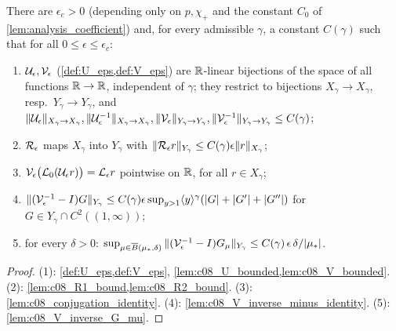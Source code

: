 \begin{lemma}
  \label{lem:linear_conjugation}
  There are $\epsilon_c>0$ (depending only on $p,\chi_+$ and the constant $C_0$ of
  \cref{lem:analysis_coefficient}) and, for every admissible $\gamma$, a constant $C(\gamma)$ such that for all
  $0\le\epsilon\le\epsilon_c$:
  \begin{enumerate}
    \item $\mathcal{U}_\epsilon,\mathcal{V}_\epsilon$ (\cref{def:U_eps,def:V_eps}) are $\mathbb{R}$-linear bijections of the space of all functions
      $\mathbb{R}\to\mathbb{R}$, independent of $\gamma$; they restrict to bijections $X_\gamma\to X_\gamma$, resp.\ $Y_\gamma\to Y_\gamma$, and
      $\|\mathcal{U}_\epsilon\|_{X_\gamma\to X_\gamma},\|\mathcal{U}_\epsilon^{-1}\|_{X_\gamma\to X_\gamma},\|\mathcal{V}_\epsilon\|_{Y_\gamma\to Y_\gamma},\|\mathcal{V}_\epsilon^{-1}\|_{Y_\gamma\to Y_\gamma}\le C(\gamma)$;
    \item $\mathcal{R}_\epsilon$ maps $X_\gamma$ into $Y_\gamma$ with $\|\mathcal{R}_\epsilon r\|_{Y_\gamma}\le C(\gamma)\epsilon\|r\|_{X_\gamma}$;
    \item $\mathcal{V}_\epsilon\bigl(\mathcal{L}_0(\mathcal{U}_\epsilon r)\bigr)=\mathcal{L}_\epsilon r$ pointwise on $\mathbb{R}$, for all $r\in X_\gamma$;
    \item $\|(\mathcal{V}_\epsilon^{-1}-I)G\|_{Y_\gamma}\le C(\gamma)\epsilon\sup_{y>1}\langle y \rangle^\gamma(|G|+|G'|+|G''|)$ for $G\in Y_\gamma\cap C^2((1,\infty))$;
    \item for every $\delta>0$: $\sup_{\mu\in\overline{B}(\mu_*,\delta)}\|(\mathcal{V}_\epsilon^{-1}-I)G_\mu\|_{Y_\gamma}\le C(\gamma)\,\epsilon\,\delta/|\mu_*|$.
  \end{enumerate}
\end{lemma}
\begin{proof}
  (1): \cref{def:U_eps,def:V_eps}, \cref{lem:c08_U_bounded,lem:c08_V_bounded}. (2): \cref{lem:c08_R1_bound,lem:c08_R2_bound}.
  (3): \cref{lem:c08_conjugation_identity}. (4): \cref{lem:c08_V_inverse_minus_identity}. (5): \cref{lem:c08_V_inverse_G_mu}.
\end{proof}

